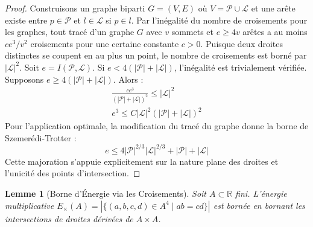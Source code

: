 \documentclass[12pt]{article}
\newtheorem{lemma}[theorem]{Lemme}
\begin{document}
\begin{proof}
Construisons un graphe biparti $G = (V, E)$ o\`u $V = \mathcal{P} \cup \mathcal{L}$ et une ar\^ete existe entre $p \in \mathcal{P}$ et $l \in \mathcal{L}$ si $p \in l$. Par l'in\'egalit\'e du nombre de croisements pour les graphes, tout trac\'e d'un graphe $G$ avec $v$ sommets et $e \geq 4v$ ar\^etes a au moins $c e^3 / v^2$ croisements pour une certaine constante $c > 0$. Puisque deux droites distinctes se coupent en au plus un point, le nombre de croisements est born\'e par $|\mathcal{L}|^2$.
Soit $e = I(\mathcal{P}, \mathcal{L})$. Si $e < 4(|\mathcal{P}| + |\mathcal{L}|)$, l'in\'egalit\'e est trivialement v\'erifi\'ee. Supposons $e \geq 4(|\mathcal{P}| + |\mathcal{L}|)$. Alors :
\begin{align*}
\frac{c e^3}{(|\mathcal{P}| + |\mathcal{L}|)^2} \leq |\mathcal{L}|^2 \\
e^3 \leq C |\mathcal{L}|^2 (|\mathcal{P}| + |\mathcal{L}|)^2
\end{align*}
Pour l'application optimale, la modification du trac\'e du graphe donne la borne de Szemer\'edi-Trotter :
\[
e \leq 4 |\mathcal{P}|^{2/3} |\mathcal{L}|^{2/3} + |\mathcal{P}| + |\mathcal{L}|
\]
Cette majoration s'appuie explicitement sur la nature plane des droites et l'unicit\'e des points d'intersection.
\end{proof}

\begin{lemma}[Borne d'\'Energie via les Croisements]
\label{lem:energy}
Soit $A \subset \mathbb{R}$ fini. L'\'energie multiplicative $E_{\times}(A) = |\{(a,b,c,d) \in A^4 \mid ab=cd\}|$ est born\'ee en bornant les intersections de droites d\'eriv\'ees de $A \times A$.
\end{lemma}
\end{document}
